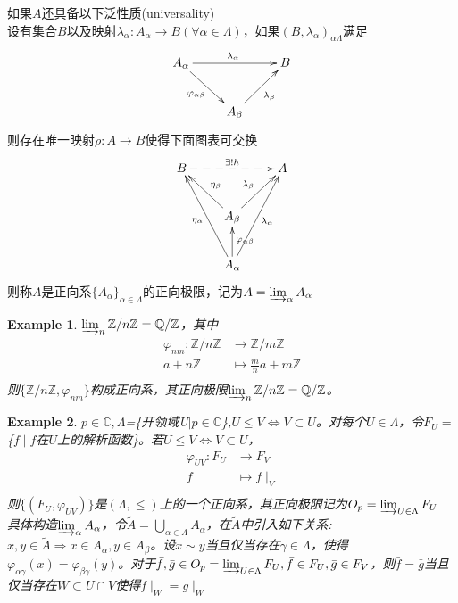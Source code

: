 \documentclass[UTF8]{article}
\newtheorem{exa}{Example}[section]
\begin{document}
如果$A$还具备以下泛性质(universality)\\
设有集合$B$以及映射$\lambda_{\alpha}:A_{\alpha}\rightarrow B(\forall\alpha\in\Lambda)$，如果$(B,\lambda_{\alpha})_{\alpha\Lambda}$满足
$$
\xymatrix{
	A_{\alpha}\ar[rr]^{\lambda_{\alpha}}\ar[rd]_{\varphi_{\alpha\beta}}& &B\\
	&A_{\beta}\ar@{->}[ru]_{\lambda_{\beta}}&
}
$$
则存在唯一映射$\rho:A\rightarrow B$使得下面图表可交换
$$
\xymatrix{
	B\ar@{-->}[rr]^{\exists !h}\ar@{<-}[rd]^{\eta_{\beta}}\ar@{<-}[rdd]_{\eta_{\alpha}}& &A\ar@{<-}[ld]_{\lambda_{\beta}}\ar@{<-}[ldd]^{\lambda_{\alpha}}\\
	&A_{\beta}\ar@{<-}[d]^{\varphi_{\alpha\beta}}&\\
	&A_{\alpha}&
}
$$
则称$A$是正向系$\{A_{\alpha}\}_{\alpha\in\Lambda}$的正向极限，记为$A=\varinjlim_{\alpha}A_{\alpha}$

\begin{exa}
	$\varinjlim_{n}\mathbb Z/{n\mathbb Z}=\mathbb Q/{\mathbb Z}$，其中
	\[
	\begin{split}
	\varphi_{nm}:\mathbb Z/{n\mathbb Z}&\rightarrow\mathbb Z/{m\mathbb Z}\\
	a+n\mathbb Z&\longmapsto \frac{m}{n}a+m\mathbb Z\\
	\end{split}
	\]
	则$\{\mathbb Z/{n\mathbb Z},\varphi_{nm}\}$构成正向系，其正向极限$\varinjlim_{n}\mathbb Z/{n\mathbb Z}=\mathbb Q/{\mathbb Z}$。
\end{exa}

\begin{exa}
	$p\in\mathbb C,\Lambda$=\{开领域U$\mid p\in\mathbb C$\},$U\leq V\Leftrightarrow V\subset U$。对每个$U\in\Lambda$，令$F_{U}=$\{$f\mid f$在$U$上的解析函数\}。若$U\leq V\Leftrightarrow V\subset U$，
	\[
	\begin{split}
	\varphi_{UV}:F_{U}&\rightarrow F_V\\
	f&\longmapsto f\mid_{V}\\
	\end{split}
	\]
	则$\{(F_U,\varphi_{UV})\}$是$(\Lambda,\leq)$上的一个正向系，其正向极限记为$O_p=\varinjlim_{U\in\Lambda}F_U$\\
	具体构造$\varinjlim_{\alpha}A_{\alpha}$，令$\widetilde A=\bigcup_{\alpha\in\Lambda}A_{\alpha}$，在$\widetilde A$中引入如下关系:$x,y\in\widetilde A\Rightarrow x\in A_{\alpha},y\in A_{\beta}$。设$x\sim y$当且仅当存在$\gamma\in\Lambda$，使得$\varphi_{\alpha\gamma}(x)=\varphi_{\beta\gamma}(y)$。对于$\bar f,\bar g\in O_p=\varinjlim_{U\in\Lambda}F_U,\bar f\in F_{U},\bar g\in F_{V}$，则$\bar f=\bar g$当且仅当存在$W\subset {U\cap V}$使得$f\mid_W=g\mid_W$
\end{exa}
\end{document}
